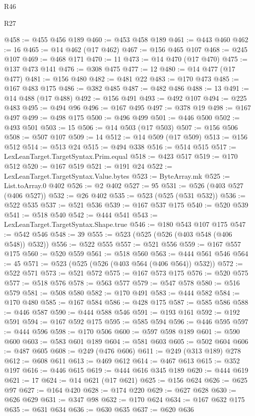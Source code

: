 \begin{lexlean}{R46}
\begin{lexlean}{R27}
\begin{coremodule}
{{{{{{{{{{{{{{{{{{{{{{{{{{{{{{{{{{{{{{{{{{{{{{{{{{{{{{{{{{{{{{@458 := @455 @456 @189
@460 := @453 @458 @189
@461 := @443 @460
@462 := 16
@465 := @14 @462 (@17 @462)
@467 := @156 @465 @107
@468 := @245 @107
@469 := @468 @171
@470 := 11
@473 := @14 @470 (@17 @470)
@475 := @137 @473 @141
@476 := @308 @475
@477 := 12
@480 := @14 @477 (@17 @477)
@481 := @156 @480
@482 := @481 @22
@483 := @170 @473
@485 := @167 @483 @175
@486 := @382 @485
@487 := @482 @486
@488 := 13
@491 := @14 @488 (@17 @488)
@492 := @156 @491
@493 := @492 @107
@494 := @225 @483
@495 := @494 @96
@496 := @167 @495
@497 := @378 @19
@498 := @167 @497
@499 := @498 @175
@500 := @496 @499
@501 := @446 @500
@502 := @493 @501
@503 := 15
@506 := @14 @503 (@17 @503)
@507 := @156 @506
@508 := @507 @107
@509 := 14
@512 := @14 @509 (@17 @509)
@513 := @156 @512
@514 := @513 @24
@515 := @494 @338
@516 := @514 @515
@517 := LexLeanTarget.TargetSyntax.Prim.equal
@518 := @423 @517
@519 := @170 @512
@520 := @167 @519
@521 := @191 @24
@522 := LexLeanTarget.TargetSyntax.Value.bytes
@523 := ByteArray.mk
@525 := List.toArray.{0} @402
@526 := @2 @402
@527 := 95
@531 := @526 (@403 @527 (@406 @527))
@532 := @26 @402
@535 := @523 (@525 (@531 @532))
@536 := @522 @535
@537 := @521 @536
@539 := @167 @537 @175
@540 := @520 @539
@541 := @518 @540
@542 := @444 @541
@543 := LexLeanTarget.TargetSyntax.Shape.true
@546 := @180 @543 @107 @175
@547 := @542 @546
@548 := 39
@555 := @523 (@525 (@526 (@403 @548 (@406 @548)) @532))
@556 := @522 @555
@557 := @521 @556
@559 := @167 @557 @175
@560 := @520 @559
@561 := @518 @560
@563 := @444 @561 @546
@564 := 45
@571 := @523 (@525 (@526 (@403 @564 (@406 @564)) @532))
@572 := @522 @571
@573 := @521 @572
@575 := @167 @573 @175
@576 := @520 @575
@577 := @518 @576
@578 := @563 @577
@579 := @547 @578
@580 := @516 @579
@581 := @508 @580
@582 := @170 @491
@583 := @444 @582
@584 := @170 @480
@585 := @167 @584
@586 := @428 @175
@587 := @585 @586
@588 := @446 @587
@590 := @444 @588 @546
@591 := @193 @161
@592 := @192 @591
@594 := @167 @592 @175
@595 := @585 @594
@596 := @446 @595
@597 := @444 @596
@598 := @170 @506
@600 := @597 @598 @189
@601 := @590 @600
@603 := @583 @601 @189
@604 := @581 @603
@605 := @502 @604
@606 := @487 @605
@608 := @249 (@476 @606)
@611 := @249 (@313 @189) @278
@612 := @608 @611
@613 := @469 @612
@614 := @467 @613
@615 := @352 @197
@616 := @446 @615
@619 := @444 @616 @345 @189
@620 := @444 @619
@621 := 17
@624 := @14 @621 (@17 @621)
@625 := @156 @624
@626 := @625 @97
@627 := @164 @420
@628 := @174 @220
@629 := @627 @628
@630 := @626 @629
@631 := @347 @98
@632 := @170 @624
@634 := @167 @632 @175
@635 := @631 @634
@636 := @630 @635
@637 := @620 @636
}}}}}}}}}}}}}}}}}}}}}}}}}}}}}}}}}}}}}}}}}}}}}}}}}}}}}}}}}}}}}}
\end{coremodule}
\end{lexlean}
\end{lexlean}
